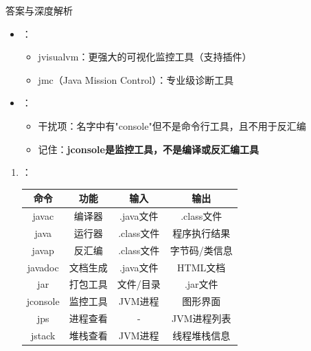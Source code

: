 \documentclass[12pt, a4paper]{ctexart}
\begin{document}
\begin{enumerate}[label=\textbf{\arabic*.}]
\begin{bluebox}{答案与深度解析}
\begin{itemize}[leftmargin=*, nosep]
			      \item {}：
			            \begin{itemize}
				            \item jvisualvm：更强大的可视化监控工具（支持插件）
				            \item jmc（Java Mission Control）：专业级诊断工具
			            \end{itemize}

			      \item {}：
			            \begin{itemize}
				            \item 干扰项：名字中有"console"但不是命令行工具，且不用于反汇编
				            \item 记住：\textbf{jconsole是监控工具，不是编译或反汇编工具}
			            \end{itemize}
		      \end{itemize}

		      \begin{enumerate}[leftmargin=*, nosep]
			      \item {}：
			            \begin{tabular}{|c|c|c|c|}
				            \hline
				            \textbf{命令} & \textbf{功能} & \textbf{输入} & \textbf{输出} \\
				            \hline
				            javac       & 编译器         & .java文件     & .class文件    \\
				            \hline
				            java        & 运行器         & .class文件    & 程序执行结果      \\
				            \hline
				            javap       & 反汇编         & .class文件    & 字节码/类信息     \\
				            \hline
				            javadoc     & 文档生成        & .java文件     & HTML文档      \\
				            \hline
				            jar         & 打包工具        & 文件/目录       & .jar文件      \\
				            \hline
				            jconsole    & 监控工具        & JVM进程       & 图形界面        \\
				            \hline
				            jps         & 进程查看        & -           & JVM进程列表     \\
				            \hline
				            jstack      & 堆栈查看        & JVM进程       & 线程堆栈信息      \\
				            \hline
			            \end{tabular}


\end{enumerate}
\end{bluebox}
\end{enumerate}
\end{document}

